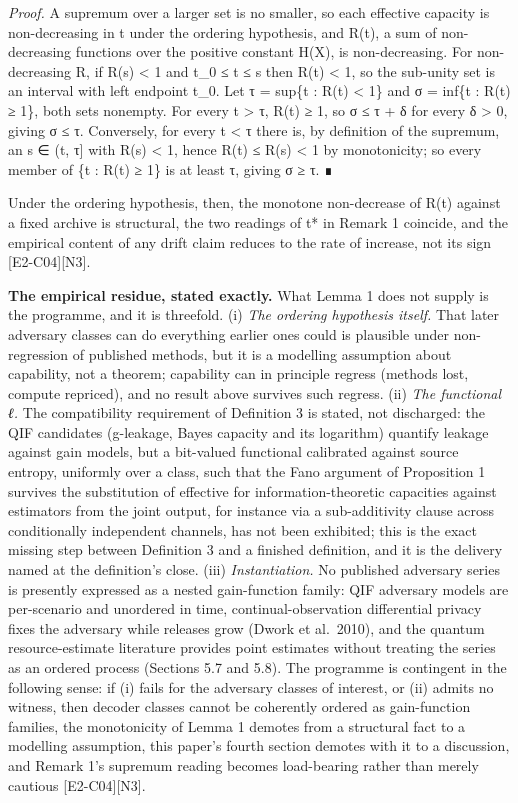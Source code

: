 \documentclass[
  11pt,
]{article}
\begin{document}
\emph{Proof.} A supremum over a larger set is no smaller, so each
effective capacity is non-decreasing in t under the ordering hypothesis,
and R(t), a sum of non-decreasing functions over the positive constant
H(X), is non-decreasing. For non-decreasing R, if R(s) \textless{} 1 and
t\_0 ≤ t ≤ s then R(t) \textless{} 1, so the sub-unity set is an
interval with left endpoint t\_0. Let τ = sup\{t : R(t) \textless{} 1\}
and σ = inf\{t : R(t) ≥ 1\}, both sets nonempty. For every t
\textgreater{} τ, R(t) ≥ 1, so σ ≤ τ + δ for every δ \textgreater{} 0,
giving σ ≤ τ. Conversely, for every t \textless{} τ there is, by
definition of the supremum, an s ∈ (t, τ{]} with R(s) \textless{} 1,
hence R(t) ≤ R(s) \textless{} 1 by monotonicity; so every member of \{t
: R(t) ≥ 1\} is at least τ, giving σ ≥ τ. ∎

Under the ordering hypothesis, then, the monotone non-decrease of R(t)
against a fixed archive is structural, the two readings of t* in Remark
1 coincide, and the empirical content of any drift claim reduces to the
rate of increase, not its sign {[}E2-C04{]}{[}N3{]}.

\textbf{The empirical residue, stated exactly.} What Lemma 1 does not
supply is the programme, and it is threefold. (i) \emph{The ordering
hypothesis itself.} That later adversary classes can do everything
earlier ones could is plausible under non-regression of published
methods, but it is a modelling assumption about capability, not a
theorem; capability can in principle regress (methods lost, compute
repriced), and no result above survives such regress. (ii) \emph{The
functional ℓ.} The compatibility requirement of Definition 3 is stated,
not discharged: the QIF candidates (g-leakage, Bayes capacity and its
logarithm) quantify leakage against gain models, but a bit-valued
functional calibrated against source entropy, uniformly over a class,
such that the Fano argument of Proposition 1 survives the substitution
of effective for information-theoretic capacities against estimators
from the joint output, for instance via a sub-additivity clause across
conditionally independent channels, has not been exhibited; this is the
exact missing step between Definition 3 and a finished definition, and
it is the delivery named at the definition's close. (iii)
\emph{Instantiation.} No published adversary series is presently
expressed as a nested gain-function family: QIF adversary models are
per-scenario and unordered in time, continual-observation differential
privacy fixes the adversary while releases grow (Dwork et al.~2010), and
the quantum resource-estimate literature provides point estimates
without treating the series as an ordered process (Sections 5.7 and
5.8). The programme is contingent in the following sense: if (i) fails
for the adversary classes of interest, or (ii) admits no witness, then
decoder classes cannot be coherently ordered as gain-function families,
the monotonicity of Lemma 1 demotes from a structural fact to a
modelling assumption, this paper's fourth section demotes with it to a
discussion, and Remark 1's supremum reading becomes load-bearing rather
than merely cautious {[}E2-C04{]}{[}N3{]}.
\end{document}
